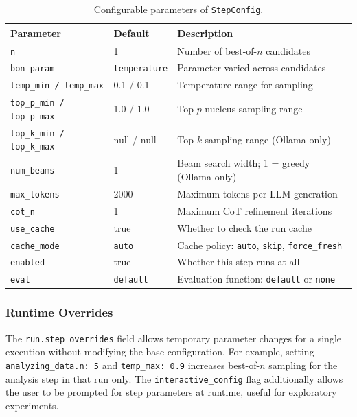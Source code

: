 \documentclass[11pt,a4paper]{article}
\begin{document}
\begin{table}[h]
\centering
\begin{tabular}{|l|l|p{6cm}|}
\hline
\rowcolor{bluePoli!30}
\textbf{Parameter} & \textbf{Default} & \textbf{Description} \T\B \\
\hline
\texttt{n} & 1 & Number of best-of-$n$ candidates \T\B \\
\texttt{bon\_param} & \texttt{temperature} & Parameter varied across candidates \T\B \\
\texttt{temp\_min / temp\_max} & 0.1 / 0.1 & Temperature range for sampling \T\B \\
\texttt{top\_p\_min / top\_p\_max} & 1.0 / 1.0 & Top-$p$ nucleus sampling range \T\B \\
\texttt{top\_k\_min / top\_k\_max} & null / null & Top-$k$ sampling range (Ollama only) \T\B \\
\texttt{num\_beams} & 1 & Beam search width; 1 = greedy (Ollama only) \T\B \\
\texttt{max\_tokens} & 2000 & Maximum tokens per LLM generation \T\B \\
\texttt{cot\_n} & 1 & Maximum CoT refinement iterations \T\B \\
\texttt{use\_cache} & true & Whether to check the run cache \T\B \\
\texttt{cache\_mode} & \texttt{auto} & Cache policy: \texttt{auto}, \texttt{skip}, \texttt{force\_fresh} \T\B \\
\texttt{enabled} & true & Whether this step runs at all \T\B \\
\texttt{eval} & \texttt{default} & Evaluation function: \texttt{default} or \texttt{none} \T\B \\
\hline
\end{tabular}
\caption{Configurable parameters of \texttt{StepConfig}.}
\label{tab:stepconfig}
\end{table}

\subsubsection{Runtime Overrides}

The \texttt{run.step\_overrides} field allows temporary parameter changes for a
single execution without modifying the base configuration. For example, setting
\texttt{analyzing\_data.n: 5} and \texttt{temp\_max: 0.9} increases best-of-$n$
sampling for the analysis step in that run only. The \texttt{interactive\_config}
flag additionally allows the user to be prompted for step parameters at runtime,
useful for exploratory experiments.
\end{document}
